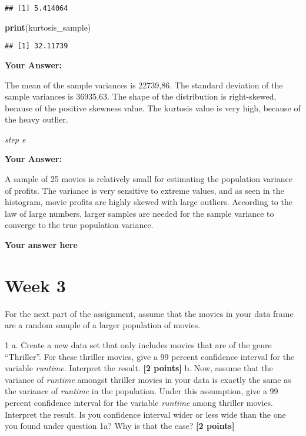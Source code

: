 \documentclass[
]{article}
\newenvironment{Shaded}{\begin{snugshade}}{\end{snugshade}}
\newcommand{\FunctionTok}[1]{\textcolor[rgb]{0.13,0.29,0.53}{\textbf{#1}}}
\newcommand{\NormalTok}[1]{#1}
\begin{document}
\begin{verbatim}
## [1] 5.414064
\end{verbatim}

\begin{Shaded}
\begin{Highlighting}[]
\FunctionTok{print}\NormalTok{(kurtosis\_sample)}
\end{Highlighting}
\end{Shaded}

\begin{verbatim}
## [1] 32.11739
\end{verbatim}

\textbf{Your Answer:}

The mean of the sample variances is 22739,86. The standard deviation of
the sample variances is 36935,63. The shape of the distribution is
right-skewed, because of the positive skewness value. The kurtosis value
is very high, because of the heavy outlier.

\emph{step e}

\textbf{Your Answer:}

A sample of 25 movies is relatively small for estimating the population
variance of profits. The variance is very sensitive to extreme values,
and as seen in the histogram, movie profits are highly skewed with large
outliers. According to the law of large numbers, larger samples are
needed for the sample variance to converge to the true population
variance.

\textbf{Your answer here}

\section{Week 3}\label{week-3}

For the next part of the assignment, assume that the movies in your data
frame are a random sample of a larger population of movies.

1 a. Create a new data set that only includes movies that are of the
genre ``Thriller''. For these thriller movies, give a 99 percent
confidence interval for the variable \emph{runtime}. Interpret the
result. \textbf{[2 points]} b. Now, assume that the variance of
\emph{runtime} amongst thriller movies in your data is exactly the same
as the variance of \emph{runtime} in the population. Under this
assumption, give a 99 percent confidence interval for the variable
\emph{runtime} among thriller movies. Interpret the result. Is you
confidence interval wider or less wide than the one you found under
question 1a? Why is that the case? \textbf{[2 points]}
\end{document}
